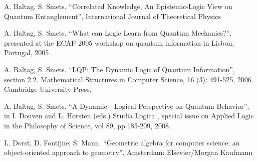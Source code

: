\documentclass[a4paper]{article}
\begin{document}
\begin{thebibliography}{9}
A. Baltag, S. Smets. ``Correlated Knowledge, An Epistemic-Logic View on 
Quantum Entanglement'', International Journal of Theoretical Physics

A. Baltag, S. Smets. ``What can Logic Learn from Quantum Mechanics?'',
presented at the ECAP 2005 workshop on quantum information in Lisbon,
Portugal, 2005

A. Baltag, S. Smets. ``LQP: The Dynamic Logic of Quantum Information'', section
2.2. 
Mathematical Structures in Computer Science, 16 (3): 491-525, 2006. 
Cambridge University Press.

A. Baltag, S. Smets. ``A Dynamic - Logical Perspective on Quantum Behavior'', 
in I. Douven and L. Horsten (eds.) Studia Logica , special issue on Applied Logic in the Philosophy of Science, vol 89, pp.185-209, 2008.

L. Dorst, D. Fontijne; S. Mann. ``Geometric algebra for computer science: an 
object-oriented approach to geometry'', Amsterdam: Elsevier/Morgan Kaufmann
\end{thebibliography}
\end{document}
